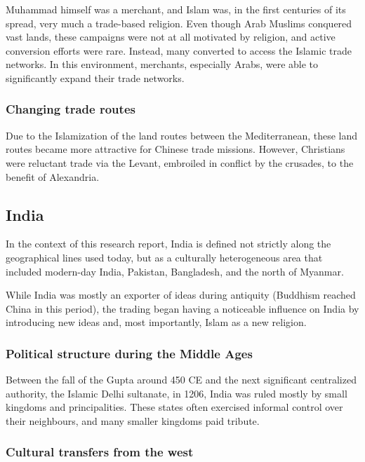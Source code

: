 \documentclass[11pt, a4paper, headings=standardclasses]{scrartcl}
\begin{document}
Muhammad himself was a merchant\autocite{Muhammad}, and Islam was, in the first centuries of its spread, very much a trade-based religion. Even though Arab Muslims conquered vast lands, these campaigns were not at all motivated by religion\autocite[200]{Lapidus}, and active conversion efforts were rare. Instead, many converted to access the Islamic trade networks.\autocite{SilkRoadIslam} In this environment, merchants, especially Arabs, were able to significantly expand their trade networks.

\subsubsection{Changing trade routes}

Due to the Islamization of the land routes between the Mediterranean, these land routes became more attractive for Chinese trade missions. However, Christians were reluctant trade via the Levant, embroiled in conflict by the crusades, to the benefit of Alexandria.\autocite[Paragraph 5]{UN}

\subsection{India}

In the context of this research report, India is defined not strictly along the geographical lines used today, but as a culturally heterogeneous area that included modern-day India, Pakistan, Bangladesh, and the north of Myanmar.

While India was mostly an exporter of ideas during antiquity (Buddhism reached China in this period\autocite{SilkRoadIslam}), the trading began having a noticeable influence on India by introducing new ideas and, most importantly, Islam as a new religion.

\subsubsection{Political structure during the Middle Ages}

Between the fall of the Gupta around 450 CE\autocite[Section \textit{Gupta}]{India} and the next significant centralized authority, the Islamic Delhi sultanate, in 1206\autocite{Delhi}, India was ruled mostly by small kingdoms and principalities. These states often exercised informal control over their neighbours, and many smaller kingdoms paid tribute.\autocite{India}

\subsubsection{Cultural transfers from the west}
\end{document}
